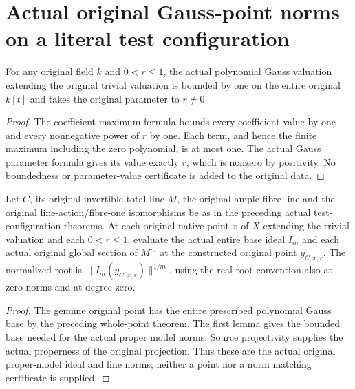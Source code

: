 \section{Actual original Gauss-point norms on a literal test configuration}

\begin{lemma}\label{lem:actual-trivial-polynomial-gauss-bound}
\leanok
For any original field $k$ and $0<r\leq1$, the actual polynomial Gauss
valuation extending the original trivial valuation is bounded by one on
the entire original $k[t]$ and takes the original parameter to $r\ne0$.
\end{lemma}
\begin{proof}
The coefficient maximum formula bounds every coefficient value by one
and every nonnegative power of $r$ by one. Each term, and hence the
finite maximum including the zero polynomial, is at most one. The
actual Gauss parameter formula gives its value exactly $r$, which is
nonzero by positivity. No boundedness or parameter-value certificate
is added to the original data.
\end{proof}

\begin{definition}\label{def:native-test-configuration-gauss-power-norms}
\leanok
Let $C$, its original invertible total line $M$, the original ample
fibre line and the original line-action/fibre-one isomorphisms be as in
the preceding actual test-configuration theorems. At each original native
point $x$ of $X$ extending the trivial valuation and each $0<r\leq1$,
evaluate the actual entire base ideal $I_m$ and each actual original
global section of $M^m$ at the constructed original point $y_{C,x,r}$.
The normalized root is $\|I_m(y_{C,x,r})\|^{1/m}$, using the real root
convention also at zero norms and at degree zero.
\end{definition}
\begin{proof}
The genuine original point has the entire prescribed polynomial Gauss
base by the preceding whole-point theorem. The first lemma gives the
bounded base needed for the actual proper model norms. Source
projectivity supplies the actual properness of the original projection.
Thus these are the actual original proper-model ideal and line norms;
neither a point nor a norm matching certificate is supplied.
\end{proof}

